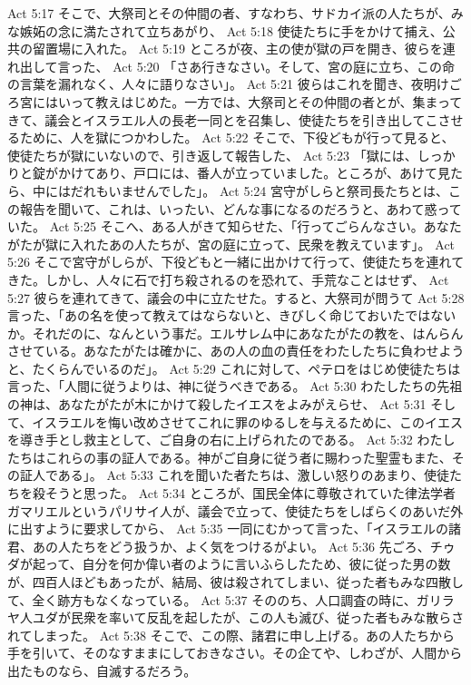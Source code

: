 Act 5:17  そこで、大祭司とその仲間の者、すなわち、サドカイ派の人たちが、みな嫉妬の念に満たされて立ちあがり、
Act 5:18  使徒たちに手をかけて捕え、公共の留置場に入れた。
Act 5:19  ところが夜、主の使が獄の戸を開き、彼らを連れ出して言った、
Act 5:20  「さあ行きなさい。そして、宮の庭に立ち、この命の言葉を漏れなく、人々に語りなさい」。
Act 5:21  彼らはこれを聞き、夜明けごろ宮にはいって教えはじめた。一方では、大祭司とその仲間の者とが、集まってきて、議会とイスラエル人の長老一同とを召集し、使徒たちを引き出してこさせるために、人を獄につかわした。
Act 5:22  そこで、下役どもが行って見ると、使徒たちが獄にいないので、引き返して報告した、
Act 5:23  「獄には、しっかりと錠がかけてあり、戸口には、番人が立っていました。ところが、あけて見たら、中にはだれもいませんでした」。
Act 5:24  宮守がしらと祭司長たちとは、この報告を聞いて、これは、いったい、どんな事になるのだろうと、あわて惑っていた。
Act 5:25  そこへ、ある人がきて知らせた、「行ってごらんなさい。あなたがたが獄に入れたあの人たちが、宮の庭に立って、民衆を教えています」。
Act 5:26  そこで宮守がしらが、下役どもと一緒に出かけて行って、使徒たちを連れてきた。しかし、人々に石で打ち殺されるのを恐れて、手荒なことはせず、
Act 5:27  彼らを連れてきて、議会の中に立たせた。すると、大祭司が問うて
Act 5:28  言った、「あの名を使って教えてはならないと、きびしく命じておいたではないか。それだのに、なんという事だ。エルサレム中にあなたがたの教を、はんらんさせている。あなたがたは確かに、あの人の血の責任をわたしたちに負わせようと、たくらんでいるのだ」。
Act 5:29  これに対して、ペテロをはじめ使徒たちは言った、「人間に従うよりは、神に従うべきである。
Act 5:30  わたしたちの先祖の神は、あなたがたが木にかけて殺したイエスをよみがえらせ、
Act 5:31  そして、イスラエルを悔い改めさせてこれに罪のゆるしを与えるために、このイエスを導き手とし救主として、ご自身の右に上げられたのである。
Act 5:32  わたしたちはこれらの事の証人である。神がご自身に従う者に賜わった聖霊もまた、その証人である」。
Act 5:33  これを聞いた者たちは、激しい怒りのあまり、使徒たちを殺そうと思った。
Act 5:34  ところが、国民全体に尊敬されていた律法学者ガマリエルというパリサイ人が、議会で立って、使徒たちをしばらくのあいだ外に出すように要求してから、
Act 5:35  一同にむかって言った、「イスラエルの諸君、あの人たちをどう扱うか、よく気をつけるがよい。
Act 5:36  先ごろ、チゥダが起って、自分を何か偉い者のように言いふらしたため、彼に従った男の数が、四百人ほどもあったが、結局、彼は殺されてしまい、従った者もみな四散して、全く跡方もなくなっている。
Act 5:37  そののち、人口調査の時に、ガリラヤ人ユダが民衆を率いて反乱を起したが、この人も滅び、従った者もみな散らされてしまった。
Act 5:38  そこで、この際、諸君に申し上げる。あの人たちから手を引いて、そのなすままにしておきなさい。その企てや、しわざが、人間から出たものなら、自滅するだろう。
